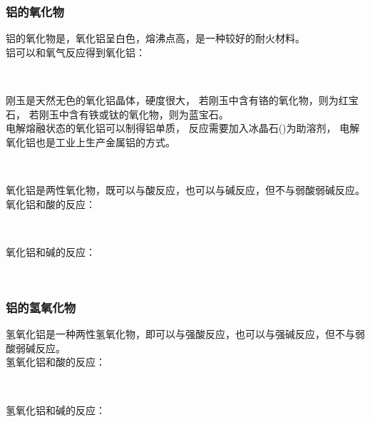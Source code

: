 \documentclass[UTF8]{ctexart}
\begin{document}
\newpage

\subsubsection{铝的氧化物}
    铝的氧化物是，氧化铝呈白色，熔沸点高，是一种较好的耐火材料。\\[3mm]
    铝可以和氧气反应得到氧化铝：
    \begin{center}
        \\[3mm]
    \end{center}
    刚玉是天然无色的氧化铝晶体，硬度很大，
    若刚玉中含有铬的氧化物，则为红宝石，
    若刚玉中含有铁或钛的氧化物，则为蓝宝石。\\[3mm]
    电解熔融状态的氧化铝可以制得铝单质，
    反应需要加入冰晶石()为助溶剂，
    电解氧化铝也是工业上生产金属铝的方式。
    \begin{center}
        \\[8mm]
    \end{center}
    氧化铝是两性氧化物，既可以与酸反应，也可以与碱反应，但不与弱酸弱碱反应。\\[3mm]
    氧化铝和酸的反应：
    \begin{center}
        \\[3mm]
    \end{center}
    氧化铝和碱的反应：
    \begin{center}
        \\[1mm]
    \end{center}

\subsubsection{铝的氢氧化物}
    氢氧化铝是一种两性氢氧化物，即可以与强酸反应，也可以与强碱反应，但不与弱酸弱碱反应。\\[3mm]
    氢氧化铝和酸的反应：
    \begin{center}
        \\[3mm]
    \end{center}
    氢氧化铝和碱的反应：
    \begin{center}
        \\[3mm]
    \end{center}
\end{document}
